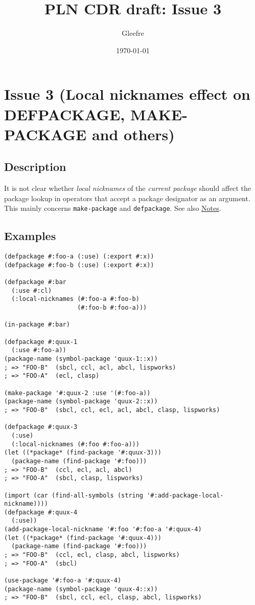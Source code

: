 \documentclass[11pt]{article}
\author{Gleefre}
\date{\today}
\title{PLN CDR draft: Issue 3}
\begin{document}
\maketitle

\section{Issue 3 (Local nicknames effect on DEFPACKAGE, MAKE-PACKAGE and others)}
\label{sec:org9953631}
\subsection{Description}
\label{sec:orgacbff08}
It is not clear whether \emph{local nicknames} of the \emph{current package} should affect
the package lookup in operators that accept a package designator as an argument.
This mainly concerns \texttt{make-package} and \texttt{defpackage}.
See also \hyperref[sec:org7ad7b2d]{Notes}.
\subsection{Examples}
\label{sec:org1743f29}
\begin{verbatim}
(defpackage #:foo-a (:use) (:export #:x))
(defpackage #:foo-b (:use) (:export #:x))

(defpackage #:bar
  (:use #:cl)
  (:local-nicknames (#:foo-a #:foo-b)
                    (#:foo-b #:foo-a)))

(in-package #:bar)

(defpackage #:quux-1
  (:use #:foo-a))
(package-name (symbol-package 'quux-1::x))
; => "FOO-B"  (sbcl, ccl, acl, abcl, lispworks)
; => "FOO-A"  (ecl, clasp)

(make-package '#:quux-2 :use '(#:foo-a))
(package-name (symbol-package 'quux-2::x))
; => "FOO-B"  (sbcl, ccl, ecl, acl, abcl, clasp, lispworks)

(defpackage #:quux-3
  (:use)
  (:local-nicknames (#:foo #:foo-a)))
(let ((*package* (find-package '#:quux-3)))
  (package-name (find-package '#:foo)))
; => "FOO-B"  (ccl, ecl, acl, abcl)
; => "FOO-A"  (sbcl, clasp, lispworks)

(import (car (find-all-symbols (string '#:add-package-local-nickname))))
(defpackage #:quux-4
  (:use))
(add-package-local-nickname '#:foo '#:foo-a '#:quux-4)
(let ((*package* (find-package '#:quux-4)))
  (package-name (find-package '#:foo)))
; => "FOO-B"  (ccl, ecl, clasp, abcl, lispworks)
; => "FOO-A"  (sbcl)

(use-package '#:foo-a '#:quux-4)
(package-name (symbol-package 'quux-4::x))
; => "FOO-B"  (sbcl, ccl, ecl, clasp, abcl, lispworks)
\end{verbatim}
\end{document}
